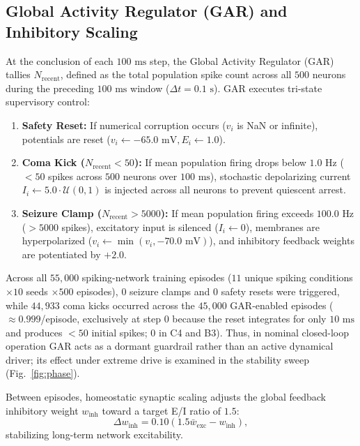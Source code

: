 \documentclass[journal]{IEEEtran}
\begin{document}
\subsection{Global Activity Regulator (GAR) and Inhibitory Scaling}
At the conclusion of each $100\text{ ms}$ step, the Global Activity Regulator (GAR) tallies $N_{\mathrm{recent}}$, defined as the total population spike count across all $500$ neurons during the preceding $100\text{ ms}$ window ($\Delta t = 0.1\text{ s}$). GAR executes tri-state supervisory control:
\begin{enumerate}
    \item \textbf{Safety Reset:} If numerical corruption occurs ($v_i$ is NaN or infinite), potentials are reset ($v_i \leftarrow -65.0\text{ mV}, E_i \leftarrow 1.0$).
    \item \textbf{Coma Kick ($N_{\mathrm{recent}} < 50$):} If mean population firing drops below $1.0\text{ Hz}$ ($<50$ spikes across $500$ neurons over $100\text{ ms}$), stochastic depolarizing current $I_i \leftarrow 5.0 \cdot \mathcal{U}(0, 1)$ is injected across all neurons to prevent quiescent arrest.
    \item \textbf{Seizure Clamp ($N_{\mathrm{recent}} > 5000$):} If mean population firing exceeds $100.0\text{ Hz}$ ($>5000$ spikes), excitatory input is silenced ($I_i \leftarrow 0$), membranes are hyperpolarized ($v_i \leftarrow \min(v_i, -70.0\text{ mV})$), and inhibitory feedback weights are potentiated by $+2.0$.
\end{enumerate}
Across all $55{,}000$ spiking-network training episodes ($11$ unique spiking conditions $\times 10$ seeds $\times 500$ episodes), $0$ seizure clamps and $0$ safety resets were triggered, while $44{,}933$ coma kicks occurred across the $45{,}000$ GAR-enabled episodes ($\approx 0.999$/episode, exclusively at step $0$ because the reset integrates for only $10\text{ ms}$ and produces $<50$ initial spikes; $0$ in C4 and B3). Thus, in nominal closed-loop operation GAR acts as a dormant guardrail rather than an active dynamical driver; its effect under extreme drive is examined in the stability sweep (Fig.~\ref{fig:phase}).

Between episodes, homeostatic synaptic scaling adjusts the global feedback inhibitory weight $w_{\mathrm{inh}}$ toward a target E/I ratio of $1.5$:
\begin{equation}
\Delta w_{\mathrm{inh}} = 0.10 \left(1.5 \bar{w}_{\mathrm{exc}} - w_{\mathrm{inh}}\right),
\label{eq:ei_scaling}
\end{equation}
stabilizing long-term network excitability.
\end{document}
